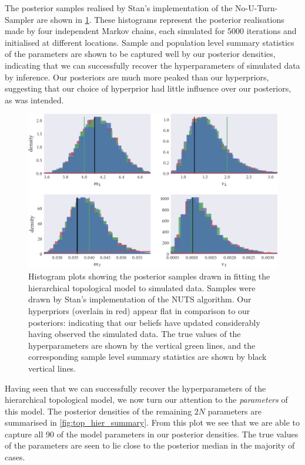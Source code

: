 The posterior samples realised by Stan's implementation of the
No-U-Turn-Sampler are shown in \cref{fig:top_hier_hist}. These histograms
represent the posterior realisations made by four independent Markov chains,
each simulated for 5000 iterations and initialised at different locations.
Sample and population level summary statistics of the parameters are shown to
be captured well by our posterior densities, indicating that we can
successfully recover the hyperparameters of simulated data by inference. Our
posteriors are much more peaked than our hyperpriors, suggesting that our
choice of hyperprior had little influence over our posteriors, as was intended.

\begin{figure}[tbp]
  \includegraphics{top/top_hier_hist.pdf}
  \caption{Histogram plots showing the posterior samples drawn in fitting the
    hierarchical topological model to simulated data. Samples were drawn by
    Stan's implementation of the NUTS algorithm. Our hyperpriors (overlain in
    red) appear flat in comparison to our posteriors: indicating that
    our beliefs have updated considerably having observed the simulated data.
    The true values of the hyperparameters are shown by the vertical green
    lines, and the corresponding sample level summary statistics are shown by black
    vertical lines.}
  \label{fig:top_hier_hist}
\end{figure}

Having seen that we can successfully recover the hyperparameters of the
hierarchical topological model, we now turn our attention to the
\emph{parameters} of this model. The posterior densities of the remaining $2N$
parameters are summarised in \cref{fig:top_hier_summary}. From this plot we see
that we are able to capture all 90 of the model parameters in our posterior
densities. The true values of the parameters are seen to lie close to the
posterior median in the majority of cases.

